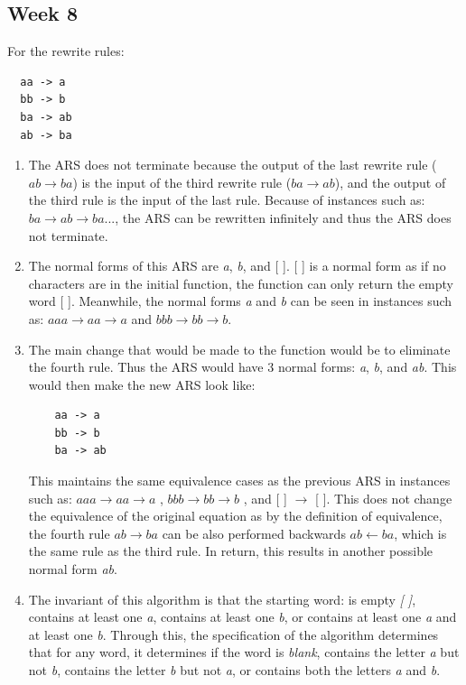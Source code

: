 \documentclass{article}
\theoremstyle{theorem}
\theoremstyle{definition}
\theoremstyle{remark}
\begin{document}
\subsection{Week 8}
For the rewrite rules:
\begin{lstlisting}
  aa -> a
  bb -> b
  ba -> ab
  ab -> ba
\end{lstlisting}
\begin{enumerate}
    \item The ARS does not terminate because the output of the last rewrite rule ($ab\xrightarrow{}ba$) is the input of the third rewrite rule ($ba\xrightarrow{}ab$), and the output of the third rule is the input of the last rule. Because of instances such as: $ba \xrightarrow{} ab \xrightarrow{} ba ...$, the ARS can be rewritten infinitely and thus the ARS does not terminate.
    \item The normal forms of this ARS are \textit{a}, \textit{b}, and [ ]. [ ] is a normal form as if no characters are in the initial function, the function can only return the empty word [ ]. Meanwhile, the normal forms \textit{a} and \textit{b} can be seen in instances such as: $aaa \xrightarrow{} aa \xrightarrow{} a$ and $bbb \xrightarrow{}  bb \xrightarrow{} b$.
    \item The main change that would be made to the function would be to eliminate the fourth rule. Thus the ARS would have 3 normal forms: \textit{a}, \textit{b}, and \textit{ab}. This would then make the new ARS look like:
    \begin{lstlisting}
    aa -> a
    bb -> b
    ba -> ab
    \end{lstlisting}

    This maintains the same equivalence cases as the previous ARS in instances such as: $aaa \xrightarrow{} aa \xrightarrow{} a$ , $bbb \xrightarrow{}  bb \xrightarrow{} b$ , and [ ] $\xrightarrow{}$ [ ]. This does not change the equivalence of the original equation as by the definition of equivalence, the fourth rule $ab \xrightarrow{} ba$ can be also performed backwards $ab \xleftarrow{} ba$, which is the same rule as the third rule. In return, this results in another possible normal form \textit{ab}.
    \item The invariant of this algorithm is that the starting word: is empty \textit{[ ]}, contains at least one \textit{a}, contains at least one \textit{b}, or contains at least one \textit{a} and at least one \textit{b}. Through this, the specification of the algorithm determines that for any word, it determines if the word is \textit{blank}, contains the letter \textit{a} but not \textit{b}, contains the letter \textit{b} but not \textit{a}, or contains both the letters \textit{a} and \textit{b}.
\end{enumerate}
\end{document}
